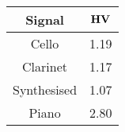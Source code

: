 \begin{tabular}{|c|c|}
	\hline
	\bf{Signal} & $\textbf{\textrm{HV}}$ \tabularnewline
	\hline
	\hline
	Cello & 1.19 \tabularnewline
	\hline
	Clarinet & 1.17 \tabularnewline
	\hline
	Synthesised & 1.07 \tabularnewline
	\hline
	Piano & 2.80 \tabularnewline
	\hline
\end{tabular}
